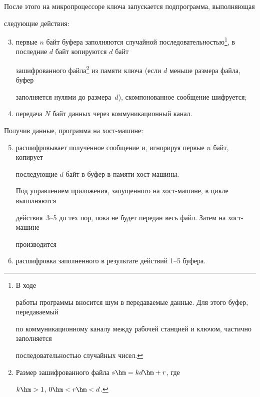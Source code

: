 После этого на микропроцессоре ключа запускается подпрограмма, выполняющая 


следующие действия:


\begin{enumerate}[(1)]


\setcounter{enumi}{2}


\item первые $n$ байт буфера заполняются случайной последовательностью\footnote{В ходе 


работы программы вносится шум в передаваемые данные. Для этого буфер, передаваемый 


по коммуникационному каналу между рабочей станцией и ключом, частично заполняется 


последовательностью случайных чисел.}, в последние $d$ байт копируются $d$ байт 


зашифрованного файла\footnote{Размер зашифрованного файла $s\hm=kd\hm+r$, где 


$k\hm>1$, $0\hm<r\hm<d$.} из памяти ключа (если $d$ меньше размера файла, буфер 


заполняется нулями до размера~$d$), скомпонованное сообщение шифруется;


\item передача $N$ байт данных через коммуникационный канал.


\end{enumerate}





Получив данные, программа на хост-машине:


\begin{enumerate}[(1)]


\setcounter{enumi}{4}


\item расшифровывает полученное сообщение и, игнорируя первые $n$ байт, копирует 


последующие $d$ байт в буфер в памяти хост-машины.


    


    Под управлением приложения, запущенного на хост-машине, в цикле выполняются 


действия~3--5 до тех пор, пока не будет передан весь файл. Затем на хост-машине 


производится


\item расшифровка заполненного в результате действий 1--5 буфера. 


\end{enumerate}


